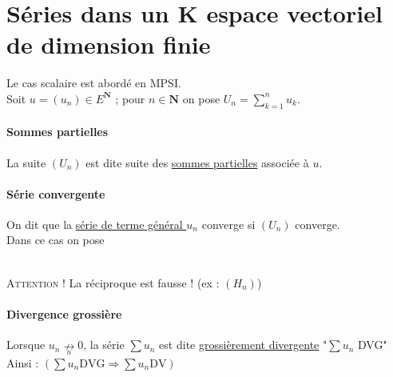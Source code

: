 
		\medskip
		
\section{Séries dans un K espace vectoriel de dimension finie}
		
		
		Le cas scalaire est abordé en MPSI. \\

		Soit $u = (u_n) \in E^{\mathbf{N}}$ ; pour $n \in \mathbf{N}$ on pose $U_n = \sum_{k=1}^{n} u_k$. 
		
		\traitd
		\paragraph{Sommes partielles} La suite $(U_n)$ est dite suite des \underline{sommes partielles} associée à $u$.
		\traitdouble
		\paragraph{Série convergente} On dit que la \underline{série de terme général $u_n$} converge si $\left(U_n\right)$ converge.
			\\\hspace*{2cm} Dans ce cas on pose $~$ 
		\trait
		
		 \medskip \\ 
		\textsc{Attention !} La réciproque est fausse ! (ex : $(H_n)$)
		
		\traitd
		\paragraph{Divergence grossière}
			Lorsque $u_n \underset{n}{\nrightarrow} 0$, la série $\sum u_n$ est dite \underline{grossièrement divergente} "$\sum u_n$ DVG" 
			\hspace*{1cm}Ainsi : $\left(\sum u_n \mathrm{DVG} \Rightarrow \sum u_n \mathrm{DV} \right)$
		\trait
			
			
